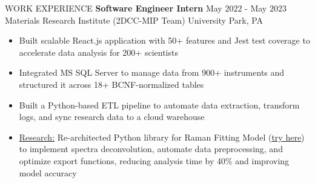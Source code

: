 \documentclass{resume} %
\begin{document}
\begin{rSection}{WORK EXPERIENCE}
{\bf Software Engineer Intern} \hfill May $2022$ - May $2023$\\
Materials Research Institute (2DCC-MIP Team) \hfill University Park, PA
\begin{itemize}[itemsep = -4pt]
    \item Built scalable React.js application with 50+ features and Jest test coverage to accelerate data analysis for 200+ scientists
    \item Integrated MS SQL Server to manage data from 900+ instruments and structured it across 18+ BCNF-normalized tables
    \item Built a Python-based ETL pipeline to automate data extraction, transform logs, and sync research data to a cloud warehouse
    \item \underline{Research:} Re-architected Python library for Raman Fitting Model ({\href{https://github.com/harshitjain17/Raman-Peak-Fitting-Model/}{try here}}) to implement spectra deconvolution, automate data preprocessing, and optimize export functions, reducing analysis time by 40\% and improving model accuracy
\end{itemize}

\end{rSection} 
\end{document}
